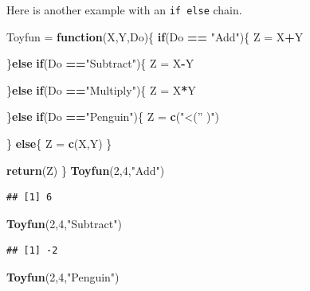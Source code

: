 \documentclass[
]{book}
\newenvironment{Shaded}{\begin{snugshade}}{\end{snugshade}}
\newcommand{\ControlFlowTok}[1]{\textcolor[rgb]{0.13,0.29,0.53}{\textbf{#1}}}
\newcommand{\DecValTok}[1]{\textcolor[rgb]{0.00,0.00,0.81}{#1}}
\newcommand{\KeywordTok}[1]{\textcolor[rgb]{0.13,0.29,0.53}{\textbf{#1}}}
\newcommand{\NormalTok}[1]{#1}
\newcommand{\OperatorTok}[1]{\textcolor[rgb]{0.81,0.36,0.00}{\textbf{#1}}}
\newcommand{\StringTok}[1]{\textcolor[rgb]{0.31,0.60,0.02}{#1}}
\begin{document}
Here is another example with an \texttt{if\ else} chain.

\begin{Shaded}
\begin{Highlighting}[]
\NormalTok{Toyfun =}\StringTok{ }\ControlFlowTok{function}\NormalTok{(X,Y,Do)\{}
  \ControlFlowTok{if}\NormalTok{(Do }\OperatorTok{==}\StringTok{ "Add"}\NormalTok{)\{}
\NormalTok{    Z =}\StringTok{ }\NormalTok{X}\OperatorTok{+}\NormalTok{Y}

\NormalTok{  \}}\ControlFlowTok{else} \ControlFlowTok{if}\NormalTok{(Do }\OperatorTok{==}\StringTok{"Subtract"}\NormalTok{)\{}
\NormalTok{    Z =}\StringTok{ }\NormalTok{X}\OperatorTok{-}\NormalTok{Y}

\NormalTok{  \}}\ControlFlowTok{else} \ControlFlowTok{if}\NormalTok{(Do }\OperatorTok{==}\StringTok{"Multiply"}\NormalTok{)\{}
\NormalTok{    Z =}\StringTok{ }\NormalTok{X}\OperatorTok{*}\NormalTok{Y}

    
\NormalTok{  \}}\ControlFlowTok{else} \ControlFlowTok{if}\NormalTok{(Do }\OperatorTok{==}\StringTok{"Penguin"}\NormalTok{)\{}
\NormalTok{    Z =}\StringTok{ }\KeywordTok{c}\NormalTok{(}\StringTok{"<('' )"}\NormalTok{)}
    
\NormalTok{  \} }\ControlFlowTok{else}\NormalTok{\{}
\NormalTok{    Z =}\StringTok{ }\KeywordTok{c}\NormalTok{(X,Y)}
\NormalTok{  \}}
  
  \KeywordTok{return}\NormalTok{(Z)}
\NormalTok{\}}
\KeywordTok{Toyfun}\NormalTok{(}\DecValTok{2}\NormalTok{,}\DecValTok{4}\NormalTok{,}\StringTok{"Add"}\NormalTok{)}
\end{Highlighting}
\end{Shaded}

\begin{verbatim}
## [1] 6
\end{verbatim}

\begin{Shaded}
\begin{Highlighting}[]
\KeywordTok{Toyfun}\NormalTok{(}\DecValTok{2}\NormalTok{,}\DecValTok{4}\NormalTok{,}\StringTok{"Subtract"}\NormalTok{)}
\end{Highlighting}
\end{Shaded}

\begin{verbatim}
## [1] -2
\end{verbatim}

\begin{Shaded}
\begin{Highlighting}[]
\KeywordTok{Toyfun}\NormalTok{(}\DecValTok{2}\NormalTok{,}\DecValTok{4}\NormalTok{,}\StringTok{"Penguin"}\NormalTok{)}
\end{Highlighting}
\end{Shaded}
\end{document}
